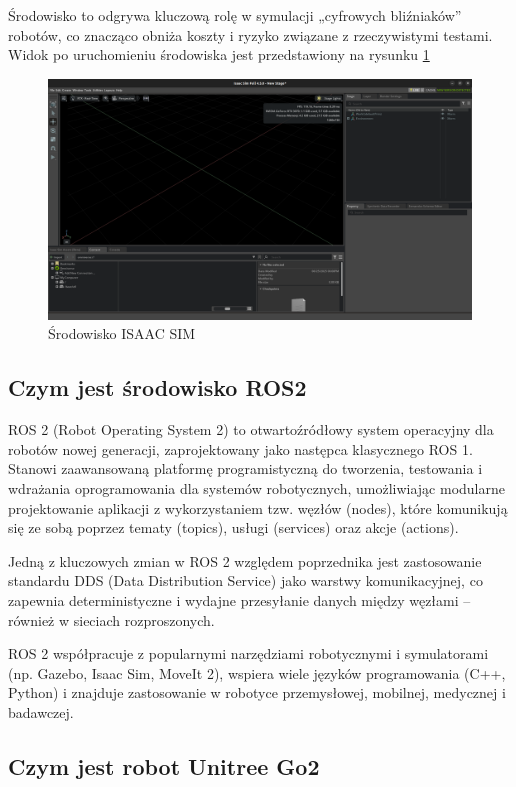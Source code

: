 \documentclass[12pt]{article}
\begin{document}
Środowisko to odgrywa kluczową rolę w symulacji „cyfrowych bliźniaków” robotów, co znacząco obniża koszty i ryzyko związane z rzeczywistymi testami. Widok po uruchomieniu środowiska jest przedstawiony na rysunku \ref{srodowiskoISAACSIM}

\begin{figure}[h]
    \centering
    \includegraphics[width=0.75\linewidth]{Zdjęcia/widokISAACSIM.png}
    \caption{Środowisko ISAAC SIM}
    \label{srodowiskoISAACSIM}
\end{figure}

\clearpage

\subsection{Czym jest środowisko ROS2}

ROS 2 (Robot Operating System 2) to otwartoźródłowy system operacyjny dla robotów nowej generacji, zaprojektowany jako następca klasycznego ROS 1. Stanowi zaawansowaną platformę programistyczną do tworzenia, testowania i wdrażania oprogramowania dla systemów robotycznych, umożliwiając modularne projektowanie aplikacji z wykorzystaniem tzw. węzłów (nodes), które komunikują się ze sobą poprzez tematy (topics), usługi (services) oraz akcje (actions).


Jedną z kluczowych zmian w ROS 2 względem poprzednika jest zastosowanie standardu DDS (Data Distribution Service) jako warstwy komunikacyjnej, co zapewnia deterministyczne i wydajne przesyłanie danych między węzłami – również w sieciach rozproszonych.

ROS 2 współpracuje z popularnymi narzędziami robotycznymi i symulatorami (np. Gazebo, Isaac Sim, MoveIt 2), wspiera wiele języków programowania (C++, Python) i znajduje zastosowanie w robotyce przemysłowej, mobilnej, medycznej i badawczej.

\subsection{Czym jest robot Unitree Go2}
\end{document}
